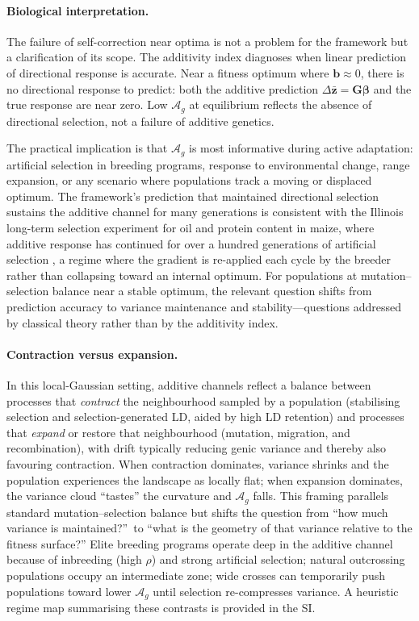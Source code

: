 \documentclass[9pt,twocolumn,twoside,lineno]{gsajnl}
\newcommand{\vect}[1]{\boldsymbol{#1}}
\newcommand{\Ag}{\ensuremath{\mathcal{A}_{g}}\xspace}
\begin{document}
\paragraph{Biological interpretation.}
The failure of self-correction near optima is not a problem for the framework but a clarification of its scope. The additivity index diagnoses when linear prediction of directional response is accurate. Near a fitness optimum where $\vect{b} \approx 0$, there is no directional response to predict: both the additive prediction $\Delta\bar{\vect{z}} = \vect{G}\bm{\beta}$ and the true response are near zero. Low \Ag at equilibrium reflects the absence of directional selection, not a failure of additive genetics.

The practical implication is that \Ag is most informative during active adaptation: artificial selection in breeding programs, response to environmental change, range expansion, or any scenario where populations track a moving or displaced optimum. The framework's prediction that maintained directional selection sustains the additive channel for many generations is consistent with the Illinois long-term selection experiment for oil and protein content in maize, where additive response has continued for over a hundred generations of artificial selection \citep{Dudley2007}, a regime where the gradient is re-applied each cycle by the breeder rather than collapsing toward an internal optimum. For populations at mutation--selection balance near a stable optimum, the relevant question shifts from prediction accuracy to variance maintenance and stability---questions addressed by classical theory \citep{Lande1980, Turelli1984, Burger2000} rather than by the additivity index.

\paragraph{Contraction versus expansion.}
In this local-Gaussian setting, additive channels reflect a balance between processes that \emph{contract} the neighbourhood sampled by a population (stabilising selection and selection-generated LD, aided by high LD retention) and processes that \emph{expand} or restore that neighbourhood (mutation, migration, and recombination), with drift typically reducing genic variance and thereby also favouring contraction. When contraction dominates, variance shrinks and the population experiences the landscape as locally flat; when expansion dominates, the variance cloud ``tastes'' the curvature and \Ag falls. This framing parallels standard mutation--selection balance but shifts the question from ``how much variance is maintained?''\ to ``what is the geometry of that variance relative to the fitness surface?'' Elite breeding programs operate deep in the additive channel because of inbreeding (high $\rho$) and strong artificial selection; natural outcrossing populations occupy an intermediate zone; wide crosses can temporarily push populations toward lower \Ag until selection re-compresses variance. A heuristic regime map summarising these contrasts is provided in the SI.
\end{document}

